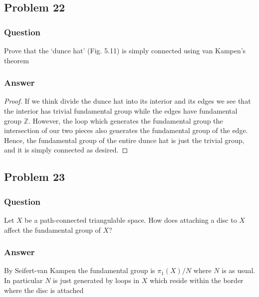 \documentclass[10pt]{article}
\begin{document}
\subsection{Problem 22}
\subsubsection{Question}
Prove that the `dunce hat' (Fig. 5.11) is simply connected using van Kampen's theorem
\subsubsection{Answer}
\begin{proof}
If we think divide the dunce hat into its interior and its edges we see that the interior has trivial fundamental group while the edges have fundamental group $\mathbb{Z}$. However, the loop which generates the fundamental group the intersection of our two pieces also generates the fundamental group of the edge. Hence, the fundamental group of the entire dunce hat is just the trivial group, and it is simply connected as desired.
\end{proof}

\subsection{Problem 23}
\subsubsection{Question}
Let $X$ be a path-connected triangulable space. How does attaching a disc to $X$ affect the fundamental group of $X$?
\subsubsection{Answer}
By Seifert-van Kampen the fundamental group is $\pi_1(X) / N$ where $N$ is as usual. In particular $N$ is just generated by loops in $X$ which reside within the border where the disc is attached
\end{document}
